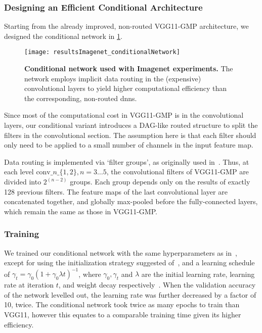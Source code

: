 \documentclass[thesis]{subfiles}
\begin{document}
	\subsubsection{Designing an Efficient Conditional Architecture}
	Starting from the already improved, non-routed VGG11-GMP architecture, we designed the conditional network in \cref{fig:Imagenet_CondNet}.
	\begin{figure}[tbp]
		\centering
		\texttt{[image: resultsImagenet\_conditionalNetwork]}
		\caption[Conditional network used with ILSVRC experiments]{\textbf{Conditional network used with Imagenet experiments.} The network employs implicit data routing in the (expensive) convolutional layers to yield higher computational efficiency than the corresponding, non-routed \glspl{dnn}.}\label{fig:Imagenet_CondNet}
	\end{figure}
	Since most of the computational cost in VGG11-GMP is in the convolutional layers, our conditional variant 
	introduces a DAG-like routed structure to split the filters in the convolutional section.
	The assumption here is that each filter should only need to be applied to a small number of channels in the input feature map.
	
	Data routing is implemented via `filter groups', as originally used in~\citep{Krizhevsky2012}. 
	Thus, at each level $\textrm{conv}\_n\_\{1,2\}, n=3\ldots 5$, the convolutional filters of VGG11-GMP are 
	divided into $2^{(n-2)}$ groups. Each group depends only on the results of exactly 128 previous filters. 
	The feature maps of the last convolutional layer are concatenated together, and globally max-pooled
	before the fully-connected layers, which remain the same as those in VGG11-GMP.
	
	\subsubsection{Training}
	We trained our conditional network with the same hyperparameters as in~\citep{Simonyan2014verydeep}, 
	except for using the initialization strategy suggested of~\citep{He2015b}, and a learning schedule of 
	$\gamma_t = \gamma_0(1+\gamma_0\lambda t)^{-1}$, where $\gamma_0,\gamma_t$ and $\lambda$ 
	are the initial learning rate, learning rate at iteration $t$, and weight decay respectively~\citep{Bottou2012sgdtricks}. 
	When the validation accuracy of the network levelled out, the learning rate was further decreased by a factor of 10, twice. 
	The conditional network took twice as many epochs to train than VGG11, however this equates to a comparable
	training time given its higher efficiency.
\end{document}
